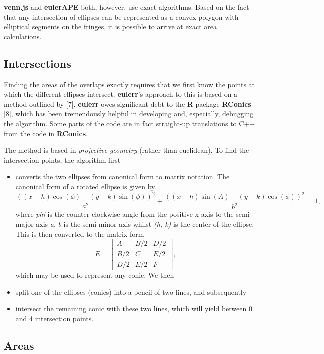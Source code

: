 \documentclass[
  headsepline=true,headings=standardclasses%
]{scrartcl}
\providecommand{\tightlist}{\setlength{\itemsep}{0pt}\setlength{\parskip}{0pt}}
\theoremstyle{definition}
\theoremstyle{definition}
\theoremstyle{remark}
\begin{document}
\textbf{venn.js} and \textbf{eulerAPE} both, however, use exact
algorithms. Based on the fact that any intersection of ellipses can be
represented as a convex polygon with elliptical segments on the fringes,
it is possible to arrive at exact area calculations.

\subsection{Intersections}\label{intersections}

Finding the areas of the overlaps exactly requires that we first know
the points at which the different ellipses intersect. \textbf{eulerr}'s
approach to this is based on a method outlined by {[}7{]}.
\textbf{eulerr} owes significant debt to the \textbf{R} package
\textbf{RConics} {[}8{]}, which has been tremendously helpful in
developing and, especially, debugging the algorithm. Some parts of the
code are in fact straight-up translations to C++ from the code in
\textbf{RConics}.

The method is based in \emph{projective geometry} (rather than
euclidean). To find the intersection points, the algorithm first

\begin{itemize}
\tightlist
\item
  converts the two ellipses from canonical form to matrix notation. The
  canonical form of a rotated ellipse is given by \[
  \frac{((x-h)\cos(\phi)+(y-k)\sin(\phi))^2}{a^2}+\frac{((x-h) \sin(A)-(y-k)
    \cos(\phi))^2}{b^2} = 1,
  \] where \emph{phi} is the counter-clockwise angle from the positive x
  axis to the semi-major axis \emph{a}. \emph{b} is the semi-minor axis
  whilst \emph{(h, k)} is the center of the ellipse. This is then
  converted to the matrix form \[
  E = \begin{bmatrix}A & B/2 & D/2 \\
                 B/2 & C & E/2 \\
                 D/2 & E/2 & F
  \end{bmatrix},
  \] which may be used to represent any conic. We then
\item
  split one of the ellipses (conics) into a pencil of two lines, and
  subsequently
\item
  intersect the remaining conic with these two lines, which will yield
  between 0 and 4 intersection points.
\end{itemize}

\subsection{Areas}\label{areas}
\end{document}
